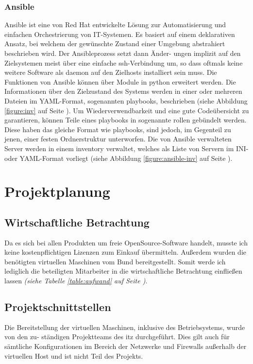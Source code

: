 \documentclass[11pt,a4paper]{article}
\begin{document}
\subsubsection{Ansible}
\label{sssec:ansible}
Ansible ist eine von Red Hat entwickelte Lösung zur Automatisierung und einfachen Orchestrierung von
IT-Systemen. Es basiert auf einem deklarativen Ansatz, bei welchem der gewünschte Zustand einer Umgebung
abstrahiert beschrieben wird. Der Ansibleprozess setzt dann Änder- ungen implizit auf den Zielsystemen meist über eine
einfache \gls{ssh}-Verbindung um, so dass oftmals keine weitere Software als \gls{daemon} auf den Zielhosts installiert sein muss.
Die Funktionen von Ansible können über Module in \gls{python} erweitert werden. Die Informationen über den Zielzustand des Systems
werden in einer oder mehreren Dateien im \gls{YAML}-Format, sogenannten \gls{playbooks}, beschrieben (siehe Abbildung \ref{figure:inv} auf Seite \pageref{figure:inv}).
Um Wiederverwendbarkeit und eine gute Codeübersicht zu garantieren, können Teile eines \gls{playbooks} in sogenannte \gls{rollen} gebündelt werden.
Diese haben das gleiche Format wie \gls{playbooks}, sind jedoch, im Gegenteil zu jenen, einer festen Ordnerstruktur unterworfen.
Die von Ansible verwalteten Server werden in einem \gls{inventory} verwaltet, welches als Liste von Servern im \gls{INI}- oder \gls{YAML}-Format
vorliegt (siehe Abbildung \ref{figure:ansible-inv} auf Seite \pageref{figure:ansible-inv}). \cite{ansible}
\\\noindent{\color[HTML]{FFF587} \rule{\linewidth}{1mm}}
\section{Projektplanung}
\subsection{Wirtschaftliche Betrachtung}
Da es sich bei allen Produkten um freie OpenSource-Software handelt, musste ich keine
kostenpflichtigen Lizenzen zum Einkauf übermitteln. Außerdem wurden die
benötigten virtuellen Maschinen vom Bund bereitgestellt. Somit werde ich lediglich
die beteiligten Mitarbeiter in die wirtschaftliche Betrachtung einfließen lassen
\emph{(siehe Tabelle \ref{table:aufwand} auf Seite \pageref{table:aufwand})}.
\subsection{Projektschnittstellen}
Die Bereitstellung der virtuellen Maschinen, inklusive des Betriebsystems,
wurde von den zu- ständigen Projektteams des \gls{itz} durchgeführt.
Dies gilt auch für sämtliche Konfigurationen im Bereich
der Netzwerke und Firewalls außerhalb der virtuellen Host
und ist nicht Teil des Projekts.
\end{document}

